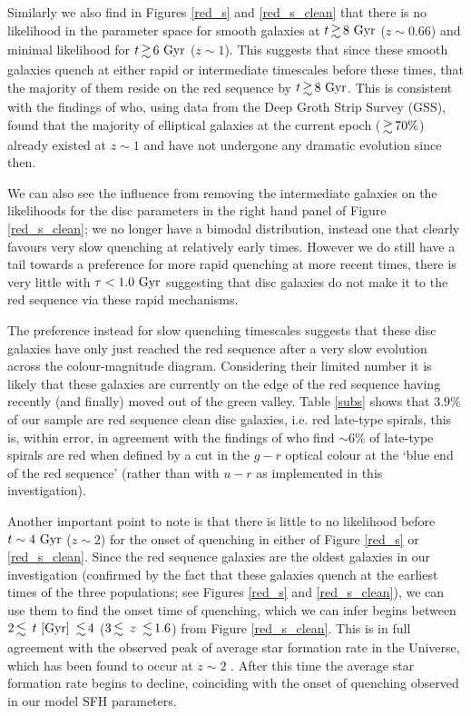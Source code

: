 \documentclass[useAMS,usenatbib]{mn2e}
\begin{document}
Similarly we also find in Figures \ref{red_s} and \ref{red_s_clean} that there is no likelihood in the parameter space for smooth galaxies at $t \ga 8~\rm{Gyr}$ ($z\sim0.66$) and minimal likelihood for $t \ga 6~\rm{Gyr}$ ($z\sim1$). This suggests that since these smooth galaxies quench at either rapid or intermediate timescales before these times, that the majority of them reside on the red sequence by $t \ga 8~\rm{Gyr}$. This is consistent with the findings of \citet{Im02} who, using data from the Deep Groth Strip Survey (GSS), found that the majority of elliptical galaxies at the current epoch ($\ga 70\%$) already existed at $z\sim1$ and have not undergone any dramatic evolution since then. 


We can also see the influence from removing the intermediate galaxies on the likelihoods for the disc parameters in the right hand panel of Figure \ref{red_s_clean}; we no longer have a bimodal distribution, instead one that clearly favours very slow quenching at relatively early times. However we do still have a tail towards a preference for more rapid quenching at more recent times, there is very little with $\tau < 1.0~\rm{Gyr}$ suggesting that disc galaxies do not make it to the red sequence via these rapid mechanisms.

The preference instead for slow quenching timescales suggests that these disc galaxies have only just reached the red sequence after a very slow evolution across the colour-magnitude diagram. Considering their limited number it is likely that these galaxies are currently on the edge of the red sequence having recently (and finally) moved out of the green valley. Table \ref{subs} shows that $3.9\%$ of our sample are red sequence clean disc galaxies, i.e. red late-type spirals, this is, within error, in agreement with the findings of \citet{Masters10} who find $\sim6\%$ of late-type spirals are red when defined by a cut in the $g-r$ optical colour at the `blue end of the red sequence' (rather than with $u-r$ as implemented in this investigation).

Another important point to note is that there is little to no likelihood before $t\sim4~\rm{Gyr}$ ($z\sim2$) for the onset of quenching in either of Figure \ref{red_s} or \ref{red_s_clean}. Since the red sequence galaxies are the oldest galaxies in our investigation (confirmed by the fact that these galaxies quench at the earliest times of the three populations; see Figures \ref{red_s} and \ref{red_s_clean}), we can use them to find the onset time of quenching, which we can infer begins between  $2 \la ~t~\rm{[Gyr]}~\la 4$ ($3 \la~ z ~\la 1.6$) from Figure \ref{red_s_clean}. This is in full agreement with the observed peak of average star formation rate in the Universe, which has been found to occur at $z\sim2$ \citep{Hopkins04}. After this time the average star formation rate begins to decline, coinciding with the onset of quenching observed in our model SFH parameters. 
\end{document}
